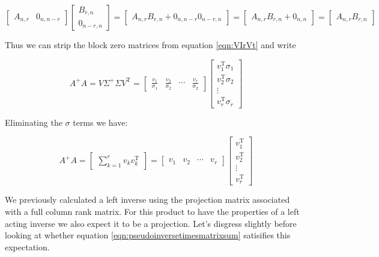 \documentclass{article}      %
\newcommand{\T}[0]{\text{T}}
\begin{document}
\[
\begin{bmatrix}
A_{n,r} & 0_{n,n-r}
\end{bmatrix}
\begin{bmatrix}
B_{r,n} \\ 0_{n-r,n}
\end{bmatrix}
=
\begin{bmatrix}
A_{n,r} B_{r,n} + 0_{n,n-r} 0_{n-r,n}
\end{bmatrix}
=
\begin{bmatrix}
A_{n,r} B_{r,n} + 0_{n,n}
\end{bmatrix}
=
\begin{bmatrix}
A_{n,r} B_{r,n}
\end{bmatrix}
\]

Thus we can strip the block zero matrices from equation \ref{eqn:VIrVt} and write

\begin{equation}\label{eqn:pseudoinversetimesmatrix}
A^{+} A =
V \Sigma^{+} \Sigma V^\T 
=
\begin{bmatrix}
\frac{v_1}{\sigma_1} & \frac{v_2}{\sigma_2} & \cdots & \frac{v_r}{\sigma_2} 
\end{bmatrix}
\begin{bmatrix}
v_1^\T \sigma_1 \\ v_2^\T \sigma_2 \\ \vdots \\ v_r^\T \sigma_r 
\end{bmatrix}
\end{equation}

Eliminating the $\sigma$ terms we have:

\begin{equation}\label{eqn:pseudoinversetimesmatrixsum}
A^{+} A =
\begin{bmatrix}
\sum_{k=1}^r {v_k}v_k^\T
\end{bmatrix}
=
\begin{bmatrix}
v_1 & v_2 & \cdots & v_r 
\end{bmatrix}
\begin{bmatrix}
v_1^\T \\ v_2^\T \\ \vdots \\ v_r^\T 
\end{bmatrix}
\end{equation}

We previously calculated a left inverse using the projection matrix associated with a full column rank matrix.  For this product to have the properties of a
left acting inverse we also expect it to be a projection.
Let's disgress
slightly before looking at whether equation
\ref{eqn:pseudoinversetimesmatrixsum} satisifies this expectation.
\end{document}
